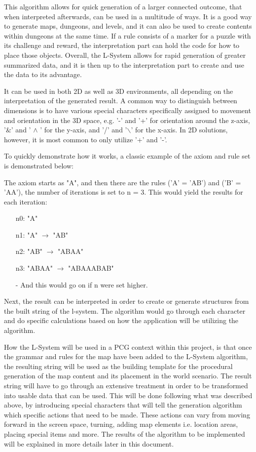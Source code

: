 This algorithm allows for quick generation of a larger connected outcome, that when interpreted afterwards, can be used in a multitude of ways. 
It is a good way to generate maps, dungeons, and levels, and it can also be used to create contents within dungeons at the same time. If a rule consists of a marker for a puzzle with its challenge and reward, the interpretation part can hold the code for how to place those objects. 
Overall, the L-System allows for rapid generation of greater summarized data, and it is then up to the interpretation part to create and use the data to its advantage.

It can be used in both 2D as well as 3D environments, all depending on the interpretation of the generated result. A common way to distinguish between dimensions is to have various special characters specifically assigned to movement and orientation in the 3D space, e.g. '-' and '+' for orientation around the z-axis, '$\&$' and ' $\wedge$ ' for the y-axis, and '/' and '$\backslash$' for the x-axis. In 2D solutions, however, it is most common to only utilize '+' and '-'. 

To quickly demonstrate how it works, a classic example of the axiom and rule set is demonstrated below:

The axiom starts as "A", and then there are the rules ('A' = 'AB') and ('B' = 'AA'), the number of iterations is set to n = 3. This would yield the results for each iteration:
\begin{itemize}
\item[n0:] "A"
\item[n1:] "A" $\rightarrow$  "AB"
\item[n2:] "AB"  $\rightarrow$ "ABAA"
\item[n3:] "ABAA"  $\rightarrow$  "ABAAABAB"
\item[-] And this would go on if n were set higher.
\end{itemize}

Next, the result can be interpreted in order to create or generate structures from the built string of the l-system. The algorithm would go through each character and do specific calculations based on how the application will be utilizing the algorithm.

How the L-System will be used in a PCG context within this project, is that once the grammar and rules for the map have been added to the L-System algorithm, the resulting string will be used as the building template for the procedural generation of the map content and its placement in the world scenario. The result string will have to go through an extensive treatment in order to be transformed into usable data that can be used. This will be done following what was described above, by introducing special characters that will tell the generation algorithm which specific actions that need to be made. These actions can vary from moving forward in the screen space, turning, adding map elements i.e. location areas, placing special items and more. The results of the algorithm to be implemented will be explained in more details later in this document.

